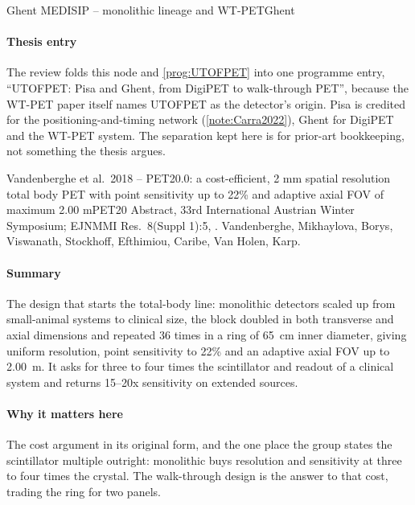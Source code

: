 \begin{programnote}{Ghent MEDISIP -- monolithic lineage and WT-PET}{Ghent}
\paragraph{Thesis entry}
The review folds this node and \ref{prog:UTOFPET} into one programme entry,
``UTOFPET: Pisa and Ghent, from DigiPET to walk-through PET'', because the
WT-PET paper itself names UTOFPET as the detector's origin. Pisa is credited
for the positioning-and-timing network (\ref{note:Carra2022}), Ghent for DigiPET
and the WT-PET system. The separation kept here is for prior-art bookkeeping,
not something the thesis argues.
 
\begin{papernote}{Vandenberghe et al.\ 2018 -- PET20.0: a cost-efficient, 2 mm spatial resolution total body PET with point sensitivity up to 22\% and adaptive axial FOV of maximum 2.00 m}{PET20}
Abstract, 33rd International Austrian Winter Symposium; EJNMMI Res.\ 8(Suppl 1):5,
. Vandenberghe, Mikhaylova, Borys, Viswanath,
Stockhoff, Efthimiou, Caribe, Van Holen, Karp.

\paragraph{Summary}
The design that starts the total-body line: monolithic detectors scaled up
from small-animal systems to clinical size, the block doubled in both
transverse and axial dimensions and repeated 36 times in a ring of
\qty{65}{\centi\metre} inner diameter, giving uniform  resolution,
point sensitivity to 22\% and an adaptive axial FOV up to \qty{2.00}{\metre}.
It asks for three to four times the scintillator and readout of a clinical
system and returns 15--20x sensitivity on extended sources.

\paragraph{Why it matters here}
The cost argument in its original form, and the one place the group states
the scintillator multiple outright: monolithic buys resolution and
sensitivity at three to four times the crystal. The walk-through design is
the answer to that cost, trading the ring for two panels.

\end{papernote}


\end{programnote}
